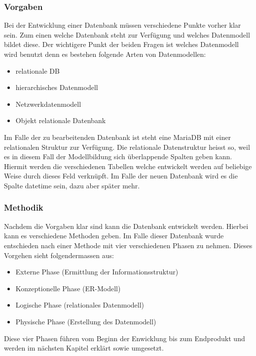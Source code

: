 \subsubsection{Vorgaben}
Bei der Entwicklung einer Datenbank müssen verschiedene Punkte vorher klar sein. Zum einen welche Datenbank steht zur Verfügung und welches Datenmodell bildet diese. Der wichtigere Punkt der beiden Fragen ist welches Datenmodell wird benutzt denn es bestehen folgende Arten von Datenmodellen:
\begin{itemize}
\item relationale DB
\item hierarchisches Datenmodell
\item Netzwerkdatenmodell
\item Objekt relationale Datenbank
\end{itemize}

Im Falle der zu bearbeitenden Datenbank ist steht eine MariaDB mit einer relationalen Struktur zur Verfügung. Die relationale Datenstruktur heisst so, weil es in diesem Fall der Modellbildung sich überlappende Spalten geben kann.\cite{IntroductionToRelationalDatabases:MariaDB} Hiermit werden die verschiedenen Tabellen welche entwickelt werden auf beliebige Weise durch dieses Feld verknüpft. Im Falle der neuen Datenbank wird es die Spalte datetime sein, dazu aber später mehr.\\

\subsubsection{Methodik}
Nachdem die Vorgaben klar sind kann die Datenbank entwickelt werden. Hierbei kann es verschiedene Methoden geben. Im Falle dieser Datenbank wurde entschieden nach einer Methode mit vier verschiedenen Phasen zu nehmen. \cite{Datenbanken:GrundlagenUndEntwurf:VeikkoKrypczyk} Dieses Vorgehen sieht folgendermassen aus:
\begin{itemize}
\item Externe Phase (Ermittlung der Informationsstruktur)
\item Konzeptionelle Phase (ER-Modell)
\item Logische Phase (relationales Datenmodell)
\item Physische Phase (Erstellung des Datenmodell)
\end{itemize}

Diese vier Phasen führen vom Beginn der Enwicklung bis zum Endprodukt und werden im nächsten Kapitel erklärt sowie umgesetzt. 
